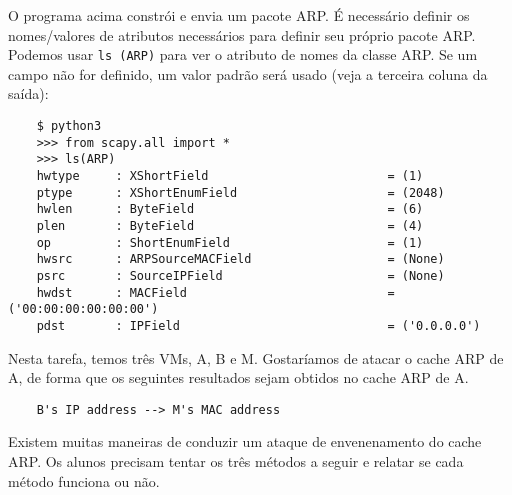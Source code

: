 	O programa acima constrói e envia um pacote ARP. É necessário definir os nomes/valores de atributos 
	necessários para definir seu próprio pacote ARP. Podemos usar \texttt{ls (ARP)} para ver o atributo
	de nomes da classe ARP. Se um campo não for definido, um valor padrão será usado (veja a terceira
	coluna da saída):
	
	\begin{lstlisting}
	$ python3
	>>> from scapy.all import *
	>>> ls(ARP)
	hwtype     : XShortField                         = (1)
	ptype      : XShortEnumField                     = (2048)
	hwlen      : ByteField                           = (6)
	plen       : ByteField                           = (4)
	op         : ShortEnumField                      = (1)
	hwsrc      : ARPSourceMACField                   = (None)
	psrc       : SourceIPField                       = (None)
	hwdst      : MACField                            = ('00:00:00:00:00:00')
	pdst       : IPField                             = ('0.0.0.0')
	\end{lstlisting}
	
	Nesta tarefa, temos três VMs, A, B e M. Gostaríamos de atacar o cache ARP de A, de forma que
	os seguintes resultados sejam obtidos no cache ARP de A.
	
	\begin{lstlisting}
	B's IP address --> M's MAC address
	\end{lstlisting}
	
	Existem muitas maneiras de conduzir um ataque de envenenamento do cache ARP. Os alunos precisam 
	tentar os três métodos a seguir e relatar se cada método funciona ou não.
	
